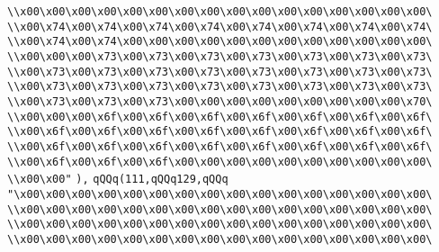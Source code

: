 \verb|\\x00\x00\x00\x00\x00\x00\x00\x00\x00\x00\x00\x00\x00\x00\x00\x00\|\newline
\verb|\\x00\x74\x00\x74\x00\x74\x00\x74\x00\x74\x00\x74\x00\x74\x00\x74\|\newline
\verb|\\x00\x74\x00\x74\x00\x00\x00\x00\x00\x00\x00\x00\x00\x00\x00\x00\|\newline
\verb|\\x00\x00\x00\x73\x00\x73\x00\x73\x00\x73\x00\x73\x00\x73\x00\x73\|\newline
\verb|\\x00\x73\x00\x73\x00\x73\x00\x73\x00\x73\x00\x73\x00\x73\x00\x73\|\newline
\verb|\\x00\x73\x00\x73\x00\x73\x00\x73\x00\x73\x00\x73\x00\x73\x00\x73\|\newline
\verb|\\x00\x73\x00\x73\x00\x73\x00\x00\x00\x00\x00\x00\x00\x00\x00\x70\|\newline
\verb|\\x00\x00\x00\x6f\x00\x6f\x00\x6f\x00\x6f\x00\x6f\x00\x6f\x00\x6f\|\newline
\verb|\\x00\x6f\x00\x6f\x00\x6f\x00\x6f\x00\x6f\x00\x6f\x00\x6f\x00\x6f\|\newline
\verb|\\x00\x6f\x00\x6f\x00\x6f\x00\x6f\x00\x6f\x00\x6f\x00\x6f\x00\x6f\|\newline
\verb|\\x00\x6f\x00\x6f\x00\x6f\x00\x00\x00\x00\x00\x00\x00\x00\x00\x00\|\newline
\verb|\\x00\x00"|\newline
\verb|),|\newline
\verb|qQQq(111,qQQq129,qQQq|\newline
\verb|"\x00\x00\x00\x00\x00\x00\x00\x00\x00\x00\x00\x00\x00\x00\x00\x00\|\newline
\verb|\\x00\x00\x00\x00\x00\x00\x00\x00\x00\x00\x00\x00\x00\x00\x00\x00\|\newline
\verb|\\x00\x00\x00\x00\x00\x00\x00\x00\x00\x00\x00\x00\x00\x00\x00\x00\|\newline
\verb|\\x00\x00\x00\x00\x00\x00\x00\x00\x00\x00\x00\x00\x00\x00\x00\x00\|\newline
